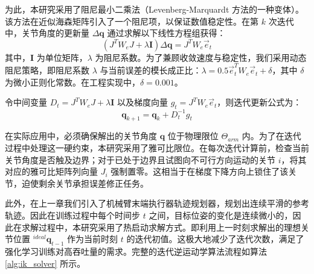 为此，本研究采用了阻尼最小二乘法（Levenberg-Marquardt 方法的一种变体）。该方法在近似海森矩阵引入了一个阻尼项，以保证数值稳定性。在第 $k$ 次迭代中，关节角度的更新量 $\Delta \mathbf{q}$ 通过求解以下线性方程组获得：
\begin{equation}
    (J^T W_e J + \lambda \mathbf{I}) \Delta \mathbf{q} = J^T W_e \vec{e}_t
\end{equation}
其中，$\mathbf{I}$ 为单位矩阵，$\lambda$ 为阻尼系数。为了兼顾收敛速度与稳定性，我们采用动态阻尼策略，即阻尼系数 $\lambda$ 与当前误差的模长成正比：$\lambda = 0.5 \vec{e}_t^T W_e \vec{e}_t + \delta$，其中 $\delta$ 为微小正则化常数。在工程实现中，$\delta=0.001$。

令中间变量 $D_t = J^T W_e J + \lambda \mathbf{I}$ 以及梯度向量 $g_t = J^T W_e \vec{e}_t$，则迭代更新公式为：
\begin{equation}
    \mathbf{q}_{k+1} = \mathbf{q}_k + D_t^{-1} g_t
\end{equation}


在实际应用中，必须确保解出的关节角度 $\mathbf{q}$ 位于物理限位 $\Theta_{arm}$ 内。为了在迭代过程中处理这一硬约束，本研究采用了雅可比限位。在每次迭代计算前，检查当前关节角度是否触及边界；对于已处于边界且试图向不可行方向运动的关节 $i$，将其对应的雅可比矩阵列向量 $J_i$ 强制置零。这相当于在梯度下降方向上锁住了该关节，迫使剩余关节承担误差修正任务。

此外，在上一章我们引入了机械臂末端执行器轨迹规划器，规划出连续平滑的参考轨迹。因此在训练过程中每个时间步 $t$ 之间，目标位姿的变化是连续微小的，因此在求解过程中，本研究采用了热启动求解方式。即利用上一时刻求解出的理想关节位置 $^{ideal}\mathbf{q}_{t-1}$ 作为当前时刻 $t$ 的迭代初值。这极大地减少了迭代次数，满足了强化学习训练对高吞吐量的需求。完整的迭代逆运动学算法流程如算法 \ref{alg:ik_solver} 所示。

